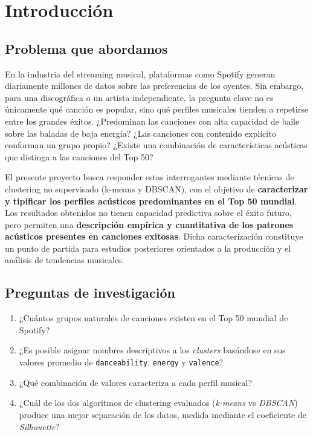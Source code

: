 \section{Introducción}

\subsection{Problema que abordamos}

En la industria del streaming musical, plataformas como Spotify generan diariamente millones de datos sobre las preferencias de los oyentes. Sin embargo, para una discográfica o un artista independiente, la pregunta clave no es únicamente qué canción es popular, sino qué perfiles musicales tienden a repetirse entre los grandes éxitos. ¿Predominan las canciones con alta capacidad de baile sobre las baladas de baja energía? ¿Las canciones con contenido explícito conforman un grupo propio? ¿Existe una combinación de características acústicas que distinga a las canciones del Top 50?

El presente proyecto busca responder estas interrogantes mediante técnicas de clustering no supervisado (k-means y DBSCAN), con el objetivo de \textbf{caracterizar y tipificar los perfiles acústicos predominantes en el Top 50 mundial}. Los resultados obtenidos no tienen capacidad predictiva sobre el éxito futuro, pero permiten una \textbf{descripción empírica y cuantitativa de los patrones acústicos presentes en canciones exitosas}. Dicha caracterización constituye un punto de partida para estudios posteriores orientados a la producción y el análisis de tendencias musicales.

\subsection{Preguntas de investigación}

\begin{enumerate}
    \item ¿Cuántos grupos naturales de canciones existen en el Top 50 mundial de Spotify?
    \item ¿Es posible asignar nombres descriptivos a los \textit{clusters} basándose en sus valores promedio de \texttt{danceability}, \texttt{energy} y \texttt{valence}?
    \item ¿Qué combinación de valores caracteriza a cada perfil musical?
    \item ¿Cuál de los dos algoritmos de clustering evaluados (\textit{k-means} vs \textit{DBSCAN}) produce una mejor separación de los datos, medida mediante el coeficiente de \textit{Silhouette}?
\end{enumerate}

